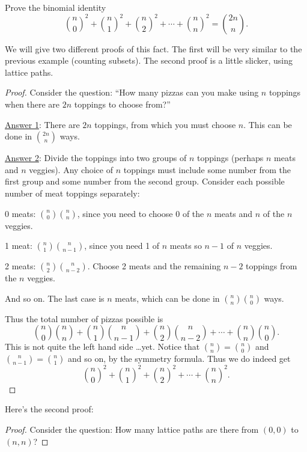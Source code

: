 \documentclass[12pt]{article}
\begin{document}
\begin{example}
  Prove the binomial identity
  \[{n \choose 0}^2 + {n \choose 1}^2 + {n \choose 2}^2 + \cdots + {n \choose n}^2 = {2n \choose n}.\]
  \begin{solution}
    We will give two different proofs of this fact.  The first will be very similar to the previous example (counting subsets).  The second proof is a little slicker, using lattice paths.

    \begin{proof}
      Consider the question: ``How many pizzas can you make using $n$ toppings when there are $2n$ toppings to choose from?''

      \underline{Answer 1}:  There are $2n$ toppings, from which you must choose $n$.  This can be done in ${2n \choose n}$ ways.

      \underline{Answer 2}: Divide the toppings into two groups of $n$ toppings (perhaps $n$ meats and $n$ veggies).  Any choice of $n$ toppings must include some number from the first group and some number from the second group.  Consider each possible number of meat toppings separately:

      0 meats: ${n \choose 0}{n \choose n}$, since you need to choose 0 of the $n$ meats and $n$ of the $n$ veggies.

      1 meat: ${n \choose 1}{n \choose n-1}$, since you need 1 of $n$ meats so $n-1$ of $n$ veggies.

      2 meats: ${n \choose 2}{n \choose n-2}$.  Choose 2 meats and the remaining $n-2$ toppings from the $n$ veggies.

      And so on.  The last case is $n$ meats, which can be done in ${n \choose n}{n \choose 0}$ ways.

      Thus the total number of pizzas possible is
      \[{n \choose 0}{n \choose n} + {n \choose 1}{n \choose n-1} + {n \choose 2}{n \choose n-2} + \cdots + {n \choose n}{n \choose 0}.\]
      This is not quite the left hand side \ldots yet.  Notice that ${n \choose n} = {n \choose 0}$ and ${n \choose n-1} = {n  \choose 1}$ and so on, by the symmetry formula.  Thus we do indeed get
      \[{n \choose 0}^2 + {n \choose 1}^2 + {n \choose 2}^2 + \cdots + {n \choose n}^2.\]
    \end{proof}

    Here's the second proof:

    \begin{proof}
      Consider the question: How many lattice paths are there from $(0,0)$ to $(n,n)$?


\end{proof}
\end{solution}
\end{example}
\end{document}
